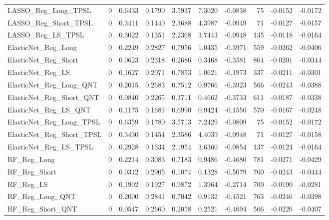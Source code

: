 \begin{tabular}{llrrrrrrrr}
\cline{1-10}
LASSO\_Reg\_Long\_TPSL & 0 & 0.6433 & 0.1790 & 3.5937 & 7.3020 & -0.0838 & 75 & -0.0152 & -0.0172 \\
\cline{1-10}
LASSO\_Reg\_Short\_TPSL & 0 & 0.3411 & 0.1440 & 2.3688 & 4.3987 & -0.0949 & 71 & -0.0127 & -0.0157 \\
\cline{1-10}
LASSO\_Reg\_LS\_TPSL & 0 & 0.3022 & 0.1351 & 2.2368 & 3.7443 & -0.0948 & 135 & -0.0118 & -0.0164 \\
\cline{1-10}
ElasticNet\_Reg\_Long & 0 & 0.2249 & 0.2827 & 0.7956 & 1.0435 & -0.3971 & 559 & -0.0262 & -0.0406 \\
\cline{1-10}
ElasticNet\_Reg\_Short & 0 & 0.0623 & 0.2318 & 0.2686 & 0.3468 & -0.3581 & 864 & -0.0201 & -0.0344 \\
\cline{1-10}
ElasticNet\_Reg\_LS & 0 & 0.1627 & 0.2071 & 0.7853 & 1.0621 & -0.1973 & 337 & -0.0211 & -0.0301 \\
\cline{1-10}
ElasticNet\_Reg\_Long\_QNT & 0 & 0.2015 & 0.2683 & 0.7512 & 0.9766 & -0.3923 & 566 & -0.0243 & -0.0388 \\
\cline{1-10}
ElasticNet\_Reg\_Short\_QNT & 0 & 0.0840 & 0.2265 & 0.3711 & 0.4662 & -0.3733 & 611 & -0.0187 & -0.0338 \\
\cline{1-10}
ElasticNet\_Reg\_LS\_QNT & 0 & 0.1175 & 0.1681 & 0.6990 & 0.9424 & -0.1556 & 570 & -0.0167 & -0.0248 \\
\cline{1-10}
ElasticNet\_Reg\_Long\_TPSL & 0 & 0.6359 & 0.1780 & 3.5713 & 7.2429 & -0.0809 & 75 & -0.0152 & -0.0172 \\
\cline{1-10}
ElasticNet\_Reg\_Short\_TPSL & 0 & 0.3430 & 0.1454 & 2.3586 & 4.4039 & -0.0948 & 71 & -0.0127 & -0.0158 \\
\cline{1-10}
ElasticNet\_Reg\_LS\_TPSL & 0 & 0.2928 & 0.1334 & 2.1954 & 3.6360 & -0.0854 & 137 & -0.0124 & -0.0164 \\
\cline{1-10}
RF\_Reg\_Long & 0 & 0.2214 & 0.3083 & 0.7183 & 0.9486 & -0.4680 & 781 & -0.0271 & -0.0429 \\
\cline{1-10}
RF\_Reg\_Short & 0 & 0.0312 & 0.2905 & 0.1074 & 0.1328 & -0.5079 & 760 & -0.0243 & -0.0444 \\
\cline{1-10}
RF\_Reg\_LS & 0 & 0.1902 & 0.1927 & 0.9872 & 1.3964 & -0.2714 & 700 & -0.0190 & -0.0281 \\
\cline{1-10}
RF\_Reg\_Long\_QNT & 0 & 0.2000 & 0.2841 & 0.7042 & 0.9132 & -0.4521 & 763 & -0.0246 & -0.0398 \\
\cline{1-10}
RF\_Reg\_Short\_QNT & 0 & 0.0547 & 0.2660 & 0.2058 & 0.2521 & -0.4694 & 566 & -0.0226 & -0.0407 \\

\end{tabular}
